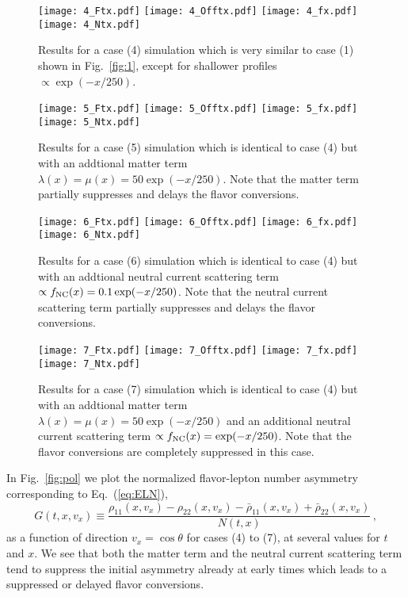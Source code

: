 \documentclass[prd,aps]{revtex4-2}
\begin{document}
\begin{figure}[p]
\texttt{[image: 4\_Ftx.pdf]}
\texttt{[image: 4\_Offtx.pdf]}
\texttt{[image: 4\_fx.pdf]}
\texttt{[image: 4\_Ntx.pdf]}
\caption[...]{Results for a case (4) simulation which is very similar to case (1) shown in Fig.~\ref{fig:1}, except for shallower
profiles $\propto\exp(-x/250)$.}
\label{fig:4}
\end{figure}

\begin{figure}[p]
\texttt{[image: 5\_Ftx.pdf]}
\texttt{[image: 5\_Offtx.pdf]}
\texttt{[image: 5\_fx.pdf]}
\texttt{[image: 5\_Ntx.pdf]}
\caption[...]{Results for a case (5) simulation which is identical to case (4) but with an addtional matter term
$\lambda(x)=\mu(x)=50\exp(-x/250)$. Note that the matter term partially suppresses and delays the flavor conversions.}
\label{fig:5}
\end{figure}

\begin{figure}[p]
\texttt{[image: 6\_Ftx.pdf]}
\texttt{[image: 6\_Offtx.pdf]}
\texttt{[image: 6\_fx.pdf]}
\texttt{[image: 6\_Ntx.pdf]}
\caption[...]{Results for a case (6) simulation which is identical to case (4) but with an addtional neutral current scattering term
$\propto f_{\rm NC}(x)=0.1\exp(-x/250)$. Note that the neutral current scattering term partially suppresses and delays the flavor conversions.}
\label{fig:6}
\end{figure}

\begin{figure}[p]
\texttt{[image: 7\_Ftx.pdf]}
\texttt{[image: 7\_Offtx.pdf]}
\texttt{[image: 7\_fx.pdf]}
\texttt{[image: 7\_Ntx.pdf]}
\caption[...]{Results for a case (7) simulation which is identical to case (4) but with an addtional matter term
$\lambda(x)=\mu(x)=50\exp(-x/250)$ and an additional neutral current scattering term
$\propto f_{\rm NC}(x)=\exp(-x/250)$. Note that the flavor conversions are completely suppressed in this case.}
\label{fig:7}
\end{figure}

In Fig.~\ref{fig:pol} we plot the normalized flavor-lepton number asymmetry corresponding to Eq.~(\ref{eq:ELN}),
\begin{equation}\label{eq:G}
  G(t,x,v_x)\equiv\frac{\rho_{11}(x,v_x)-\rho_{22}(x,v_x)-\bar\rho_{11}(x,v_x)+\bar\rho_{22}(x,v_x)}{N(t,x)}\,,
\end{equation}
as a function of direction $v_x=\cos\theta$ for cases (4) to (7), at several values for $t$ and $x$.
We see that both the matter term and the neutral current scattering term tend to suppress the initial asymmetry
already at early times which leads to a suppressed or delayed flavor conversions.
\end{document}

